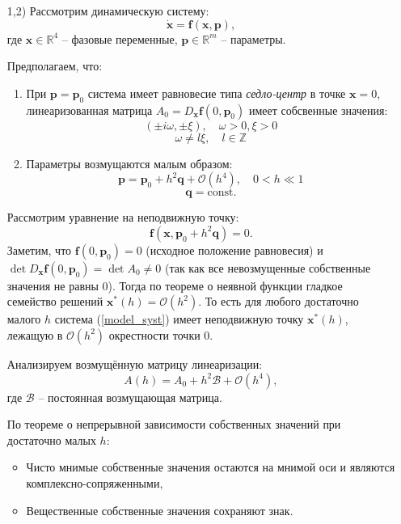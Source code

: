 \begin{enumerate}
\item[1,2)]
Рассмотрим динамическую систему:
\begin{equation}
\dot{\mathbf{x}} = \mathbf{f}(\mathbf{x}, \mathbf{p}),
\label{model_syst}
\end{equation}
где $\mathbf{x} \in \mathbb{R}^4$ -- фазовые переменные, $\mathbf{p} \in \mathbb{R}^m$ -- параметры.

Предполагаем, что:
\begin{enumerate}
\item При $\mathbf{p} = \mathbf{p}_0$ система имеет равновесие типа \textit{седло-центр} в точке $\mathbf{x} = 0$, линеаризованная матрица $A_0 = D_{\mathbf{x}}\mathbf{f}(0,\mathbf{p}_0)$ имеет собсвенные значения:
$$(\pm i \omega, \pm \xi), \quad \omega>0, \xi>0$$
$$\omega \neq l \xi, \quad l \in \mathbb{Z}$$

\item Параметры возмущаются малым образом:
\begin{equation*}
\mathbf{p} = \mathbf{p}_0 + h^2 \mathbf{q} + \mathcal{O}(h^4), \quad 0 < h \ll 1
\end{equation*}
$$\mathbf{q} = \text{const}.$$
\end{enumerate}

Рассмотрим уравнение на неподвижную точку:
$$\mathbf{f}(\mathbf{x}, \mathbf{p}_0 + h^2\mathbf{q}) = 0.$$
Заметим, что $\mathbf{f}(0, \mathbf{p}_0) = 0$ (исходное положение равновесия) и $\det {D_{\mathbf{x}}\mathbf{f}(0,\mathbf{p}_0)} = \det A_0 \ne 0$ (так как все невозмущенные собственные значения не равны 0). Тогда по теореме о неявной функции гладкое семейство решений $\mathbf{x}^*(h) = \mathcal{O}(h^2)$. То есть для любого достаточно малого $h$ система (\ref{model_syst}) имеет неподвижную точку $\mathbf{x}^*(h)$, лежащую в $\mathcal{O}(h^2)$ окрестности точки $0$.

Анализируем возмущённую матрицу линеаризации:
\begin{equation*}
A(h) = A_0 + h^2 \mathcal{B} + \mathcal{O}(h^4),
\end{equation*}
где $\mathcal{B}$ -- постоянная возмущающая матрица.

По теореме о непрерывной зависимости собственных значений \cite{arnold,horn} при достаточно малых $h$:
\begin{itemize}
\item Чисто мнимые собственные значения остаются на мнимой оси и являются комплексно-сопряженными,
\item Вещественные собственные значения сохраняют знак.
\end{itemize}


\end{enumerate}
